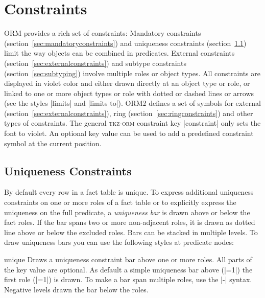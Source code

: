 \documentclass[a4paper,10pt]{article}
\begin{document}
\section{Constraints}
\label{sec:constraints}
ORM provides a rich set of constraints: Mandatory constraints (section~\ref{sec:mandatoryconstraints}) and uniqueness constraints (section~\ref{sec:uniquenessconstraints}) limit the way objects can be combined in predicates. External constraints (section~\ref{sec:externalconstraints}) and subtype constraints (section~\ref{sec:subtyping}) involve multiple roles or object types. All constraints are displayed in violet color and either drawn directly at an object type or role, or linked to one or more object types or role with dotted or dashed lines or arrows (see the styles |limits| and |limits to|). ORM2 defines a set of symbols for external (section~\ref{sec:externalconstraints}), ring (section~\ref{sec:ringconstraints}) and other types of constraints. The general \textsc{tkz-orm} constraint key |constraint| only sets the font to violet. An optional key value can be used to add a predefined constraint symbol at the current position.


\subsection{Uniqueness Constraints}
\label{sec:uniquenessconstraints}
By default every row in a fact table is unique. To express additional uniqueness constraints on one or more roles of a fact table or to explicitly express the uniqueness on the full predicate, a \emph{uniqueness bar} is drawn above or below the fact roles. If the bar spans two or more non-adjacent roles, it is drawn as dotted line above or below the excluded roles. Bars can be stacked in multiple levels. To draw uniqueness bars you can use the following styles at predicate nodes:


\begin{stylekey}{unique}
Draws a uniqueness constraint bar above one or more roles. All parts of the key value are optional. As default a simple uniqueness bar above (|=1|) the first role (|=1|) is drawn. To make a bar span multiple roles, use the |-| syntax. Negative levels drawn the bar below the roles.
\begin{codeexample}[]
\end{codeexample}
\end{stylekey}
\end{document}
